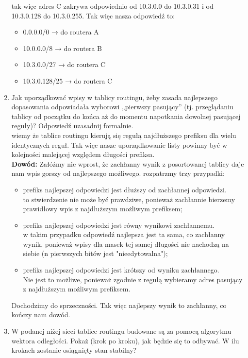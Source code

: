 \documentclass{article}[A4]
\begin{document}
\begin{enumerate}
\null \quad	tak więc adres C zakrywa odpowiednio od 10.3.0.0 do 10.3.0.31 i od 10.3.0.128 do 10.3.0.255.
\null \quad Tak więc nasza odpowiedź to:
\begin{itemize}[label=$\blacktriangleright$]
	\item 0.0.0.0/0 → do routera A
	\item 10.0.0.0/8 → do routera B
	\item 10.3.0.0/27 → do routera C
	\item 10.3.0.128/25 → do routera C
\end{itemize}
\item{Jak uporządkować wpisy w tablicy routingu, żeby zasada najlepszego dopasowania odpowiadała wyborowi „pierwszy pasujący” (tj. przeglądaniu tablicy od początku do końca aż do momentu napotkania dowolnej pasującej reguły)? Odpowiedź uzasadnij formalnie.}\\
wiemy że tablice routingu kierują się regułą najdłuższego prefiksu dla wielu identycznych reguł. Tak więc nasze uporządkowanie listy powinny być w kolejności malejącej względem długości prefiksa.\\
\textbf{Dowód:} Załóżmy nie wprost, że zachłanny wynik z posortowanej tablicy daje nam wpis gorszy od najlepszego możliwego. rozpatrzmy trzy przypadki:
\begin{itemize}
	\item prefiks najlepszej odpowiedzi jest dłuższy od zachłannej odpowiedzi.\\
	\null \quad to stwierdzenie nie może być prawdziwe, ponieważ zachłannie bierzemy prawidłowy wpis z najdłuższym możliwym prefiksem;
	\item prefiks najlepszej odpowiedzi jest równy wynikowi zachłannemu.\\
	\null \quad w takim przypadku odpowiedź najlepsza jest ta sama, co zachłanny wynik, ponieważ wpisy dla masek tej samej długości nie nachodzą na siebie (n pierwszych bitów jest "nieedytowalna");
	\item prefiks najlepszej odpowiedzi jest krótszy od wyniku zachłannego.\\
	\null \quad Nie jest to możliwe, ponieważ zgodnie z regułą wybieramy adres pasujący z najdłuższym możliwym prefiksem.
\end{itemize}
Dochodzimy do sprzeczności. Tak więc najlepszy wynik to zachłanny, co kończy nam dowód.
\item {W podanej niżej sieci tablice routingu budowane są za pomocą algorytmu wektora odległości. Pokaż (krok po kroku), jak będzie się to odbywać. W ilu krokach zostanie osiągnięty stan stabilny?}\\

\end{enumerate}
\end{document}

